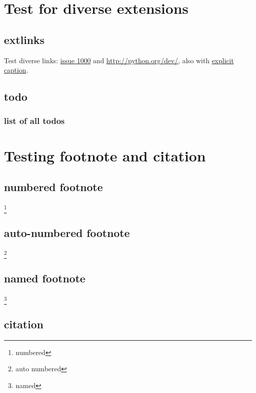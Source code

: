 \documentclass[letterpaper,10pt,english]{sphinxmanual}
\begin{document}
\chapter{Test for diverse extensions}
\label{extensions::doc}\label{extensions:test-for-diverse-extensions}

\section{extlinks}
\label{extensions:extlinks}
Test diverse links: \href{http://bugs.python.org/issue1000}{issue 1000} and \url{http://python.org/dev/}, also with
\href{http://bugs.python.org/issue1042}{explicit caption}.


\section{todo}
\label{extensions:todo}

\subsection{list of all todos}
\label{extensions:list-of-all-todos}

\chapter{Testing footnote and citation}
\label{footnote:testing-footnote-and-citation}\label{footnote::doc}

\section{numbered footnote}
\label{footnote:numbered-footnote}
\footnote[1]{\sphinxAtStartFootnote%
numbered
}


\section{auto-numbered footnote}
\label{footnote:auto-numbered-footnote}
\footnote[2]{\sphinxAtStartFootnote%
auto numbered
}


\section{named footnote}
\label{footnote:named-footnote}
\footnote[3]{\sphinxAtStartFootnote%
named
}


\section{citation}
\label{footnote:citation}
\label{footnote:id4}{\hyperref[footnote:bar]{\crossref{{[}bar{]}}}}
\end{document}
